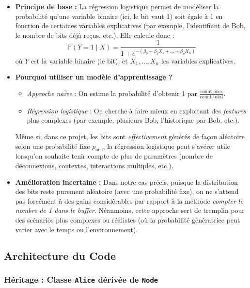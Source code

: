 \documentclass[a4paper,12pt]{article}
\begin{document}
\begin{itemize}
    \item \textbf{Principe de base :}  
    La régression logistique permet de modéliser la probabilité qu’une variable binaire (ici, le bit vaut 1) soit égale à 1 en fonction de certaines variables explicatives (par exemple, l’identifiant de Bob, le nombre de bits déjà reçus, etc.). Elle calcule donc :
    \[
    \mathbb{P}(Y=1 \mid X) = \frac{1}{1 + e^{-(\beta_0 + \beta_1 X_1 + \dots + \beta_n X_n)}}
    \]
    où $Y$ est la variable binaire (le bit), et $X_1, \dots, X_n$ les variables explicatives.

    \item \textbf{Pourquoi utiliser un modèle d’apprentissage ?}  
    \begin{itemize}
    \item \textit{Approche naïve} : On estime la probabilité d’obtenir 1 par $\frac{\text{count\_ones}}{\text{count\_total}}$.
        \item \textit{Régression logistique} : On cherche à faire mieux en exploitant des \textit{features} plus complexes (par exemple, plusieurs Bob, l’historique par Bob, etc.).
    \end{itemize}

    Même si, dans ce projet, les bits sont \textit{effectivement} générés de façon aléatoire selon une probabilité fixe $p_{\text{one}}$, la régression logistique peut s’avérer utile lorsqu’on souhaite tenir compte de plus de paramètres (nombre de déconnexions, contextes, interactions multiples, etc.).

    \item \textbf{Amélioration incertaine :}  
    Dans notre cas précis, puisque la distribution des bits reste purement aléatoire (avec une probabilité fixe), on ne s’attend pas forcément à des gains considérables par rapport à la méthode \textit{compter le nombre de 1 dans le buffer}. Néanmoins, cette approche sert de tremplin pour des scénarios plus complexes ou réalistes (où la probabilité génératrice peut varier avec le temps ou l’environnement).
\end{itemize}

\subsection{Architecture du Code}

\subsubsection{ Héritage : Classe \texttt{Alice} dérivée de \texttt{Node}}
\end{document}
